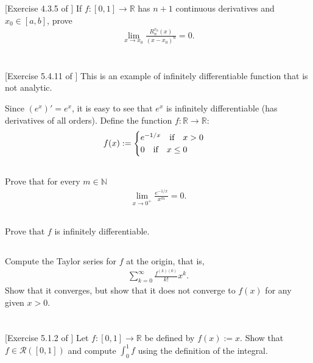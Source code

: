 \documentclass[11pt,letterpaper]{article}
\begin{document}
\section{} [Exercise 4.3.5 of \cite{Lebl_23}] 
If $f:[0,1]\to\mathbb{R}$ has $n+1$ continuous derivatives and $x_0\in[a,b]$, prove 
\begin{align}
    \lim_{x\to x_0}\frac{R^{x_0}_n(x)}{(x-x_0)^n}=0.
\end{align}

\section{} [Exercise 5.4.11 of \cite{Lebl_23}] 
This is an example of infinitely differentiable function that is not analytic.

Since $(e^x)'=e^x$, it is easy to see that $e^x$ is infinitely differentiable (has derivatives of all orders). Define the function $f:\mathbb{R}\to\mathbb{R}$:
\begin{align}
    f(x):= \begin{cases}
        e^{-1/x} \quad \mbox{if} \quad x>0\\
        0 \quad \mbox{if} \quad x\leq 0
    \end{cases}
\end{align}

\subsection{}
Prove that for every $m\in\mathbb{N}$
\begin{align}
    \lim_{x\to 0^+} \frac{e^{-1/x}}{x^m}=0.
\end{align}

\subsection{}
Prove that $f$ is infinitely differentiable.

\subsection{}
Compute the Taylor series for $f$ at the origin, that is,
\begin{align}
    \sum_{k=0}^\infty \frac{f^{(k)(0)}}{k!} x^k.
\end{align}
Show that it converges, but show that it does not converge to $f(x)$ for any given $x>0$.

\section{} [Exercise 5.1.2 of \cite{Lebl_23}] 
Let $f:[0,1]\to\mathbb{R}$ be defined by $f(x):= x$. Show that $f\in\mathcal{R}([0,1])$ and compute $\int^1_0 f$ using the definition of the integral.
\end{document}
